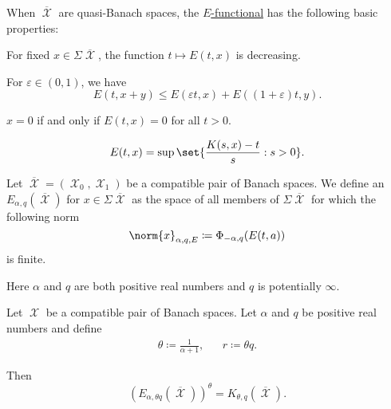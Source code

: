 \begin{proposition}\label{thm:e_functional_properties}
  When \( \overline{\mscrX} \) are quasi-Banach spaces, the \hyperref[def:e_functional]{\( E \)-functional} has the following basic properties:

  \begin{thmenum}
     For fixed \( x \in \Sigma\overline{\mscrX} \), the function \( t \mapsto E(t, x) \) is decreasing.

     For \( \varepsilon \in (0, 1) \), we have
    \begin{equation*}
      E(t, x + y) \leq E(\varepsilon t, x) + E((1 + \varepsilon) t, y).
    \end{equation*}

     \( x = 0 \) if and only if \( E(t, x) = 0 \) for all \( t > 0 \).

    \begin{equation*}
      E(t, x) = \sup \set{ \frac {K(s, x) - t} s : s > 0 }.
    \end{equation*}
  \end{thmenum}
\end{proposition}

\begin{definition}\label{def:approximation_space}
  Let \( \overline{\mscrX} = (\mscrX_0, \mscrX_1) \) be a compatible pair of Banach spaces. We define an  \( E_{\alpha,q}(\overline{\mscrX}) \) for \( x \in \Sigma\overline{\mscrX} \) as the space of all members of \( \Sigma\overline{\mscrX} \) for which the following norm
  \begin{equation}\label{eq:def:approximation_space/norm}
    \norm{x}_{\alpha,q,E} \coloneqq \Phi_{-\alpha,q}(E(t,a))
  \end{equation}
  is finite.

  Here \( \alpha \) and \( q \) are both positive real numbers and \( q \) is potentially \( \infty \).
\end{definition}

\begin{theorem}\label{thm:interpolation_space_and_approximation_space}
  Let \( \mscrX \) be a compatible pair of Banach spaces. Let \( \alpha \) and \( q \) be positive real numbers and define
  \begin{align*}
    \theta \coloneqq \frac 1 {\alpha + 1},
    &&
    r \coloneqq \theta q.
  \end{align*}

  Then
  \begin{equation*}
    (E_{\alpha,\theta q}(\overline{\mscrX}))^\theta = K_{\theta,q}(\overline{\mscrX}).
  \end{equation*}
\end{theorem}

